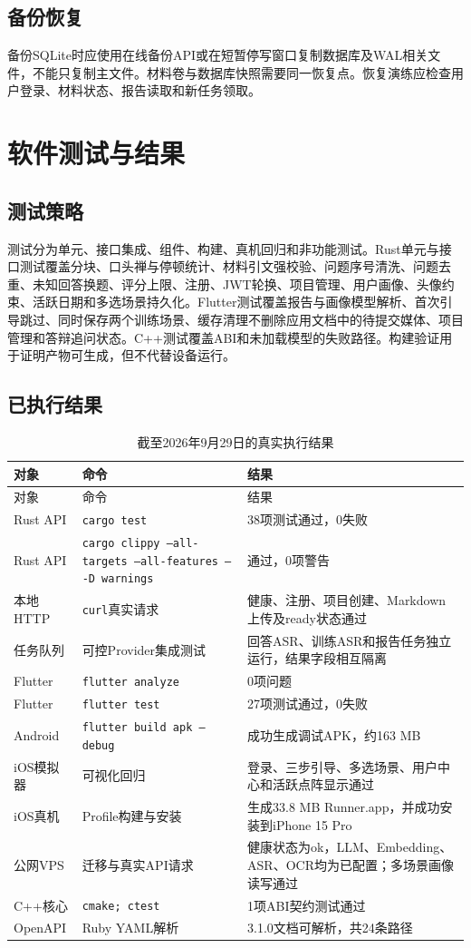 \section{备份恢复}
备份SQLite时应使用在线备份API或在短暂停写窗口复制数据库及WAL相关文件，不能只复制主文件。材料卷与数据库快照需要同一恢复点。恢复演练应检查用户登录、材料状态、报告读取和新任务领取。

\chapter{软件测试与结果}
\section{测试策略}
测试分为单元、接口集成、组件、构建、真机回归和非功能测试。Rust单元与接口测试覆盖分块、口头禅与停顿统计、材料引文强校验、问题序号清洗、问题去重、未知回答换题、评分上限、注册、JWT轮换、项目管理、用户画像、头像约束、活跃日期和多选场景持久化。Flutter测试覆盖报告与画像模型解析、首次引导跳过、同时保存两个训练场景、缓存清理不删除应用文档中的待提交媒体、项目管理和答辩追问状态。C++测试覆盖ABI和未加载模型的失败路径。构建验证用于证明产物可生成，但不代替设备运行。

\section{已执行结果}
\begin{longtable}{p{3.6cm}p{5.0cm}p{5.9cm}}
\caption{截至2026年9月29日的真实执行结果}\\
\toprule 对象 & 命令 & 结果 \\
\midrule
\endfirsthead
\toprule 对象 & 命令 & 结果 \\
\midrule
\endhead
Rust API & \texttt{cargo test} & 38项测试通过，0失败 \\
Rust API & \texttt{cargo clippy --all-targets --all-features -- -D warnings} & 通过，0项警告 \\
本地HTTP & \texttt{curl}真实请求 & 健康、注册、项目创建、Markdown上传及ready状态通过 \\
任务队列 & 可控Provider集成测试 & 回答ASR、训练ASR和报告任务独立运行，结果字段相互隔离 \\
Flutter & \texttt{flutter analyze} & 0项问题 \\
Flutter & \texttt{flutter test} & 27项测试通过，0失败 \\
Android & \texttt{flutter build apk --debug} & 成功生成调试APK，约163 MB \\
iOS模拟器 & 可视化回归 & 登录、三步引导、多选场景、用户中心和活跃点阵显示通过 \\
iOS真机 & Profile构建与安装 & 生成33.8 MB Runner.app，并成功安装到iPhone 15 Pro \\
公网VPS & 迁移与真实API请求 & 健康状态为ok，LLM、Embedding、ASR、OCR均为已配置；多场景画像读写通过 \\
C++核心 & \texttt{cmake; ctest} & 1项ABI契约测试通过 \\
OpenAPI & Ruby YAML解析 & 3.1.0文档可解析，共24条路径 \\
\bottomrule
\end{longtable}

